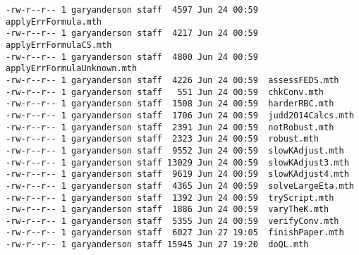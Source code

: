\documentclass[hyperref]{labbook}
\begin{document}
\begin{itemize}
\begin{verbatim}
-rw-r--r-- 1 garyanderson staff  4597 Jun 24 00:59  applyErrFormula.mth
-rw-r--r-- 1 garyanderson staff  4217 Jun 24 00:59  applyErrFormulaCS.mth
-rw-r--r-- 1 garyanderson staff  4800 Jun 24 00:59  applyErrFormulaUnknown.mth
-rw-r--r-- 1 garyanderson staff  4226 Jun 24 00:59  assessFEDS.mth
-rw-r--r-- 1 garyanderson staff   551 Jun 24 00:59  chkConv.mth
-rw-r--r-- 1 garyanderson staff  1508 Jun 24 00:59  harderRBC.mth
-rw-r--r-- 1 garyanderson staff  1706 Jun 24 00:59  judd2014Calcs.mth
-rw-r--r-- 1 garyanderson staff  2391 Jun 24 00:59  notRobust.mth
-rw-r--r-- 1 garyanderson staff  2323 Jun 24 00:59  robust.mth
-rw-r--r-- 1 garyanderson staff  9552 Jun 24 00:59  slowKAdjust.mth
-rw-r--r-- 1 garyanderson staff 13029 Jun 24 00:59  slowKAdjust3.mth
-rw-r--r-- 1 garyanderson staff  9619 Jun 24 00:59  slowKAdjust4.mth
-rw-r--r-- 1 garyanderson staff  4365 Jun 24 00:59  solveLargeEta.mth
-rw-r--r-- 1 garyanderson staff  1392 Jun 24 00:59  tryScript.mth
-rw-r--r-- 1 garyanderson staff  1886 Jun 24 00:59  varyTheK.mth
-rw-r--r-- 1 garyanderson staff  5355 Jun 24 00:59  verifyConv.mth
-rw-r--r-- 1 garyanderson staff  6027 Jun 27 19:05  finishPaper.mth
-rw-r--r-- 1 garyanderson staff 15945 Jun 27 19:20  doQL.mth
\end{verbatim}
\end{itemize}
\end{document}
